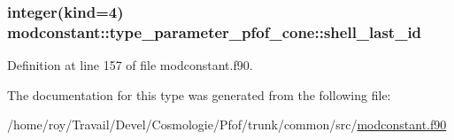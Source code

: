 \subsubsection[{\texorpdfstring{shell\+\_\+last\+\_\+id}{shell_last_id}}]{\setlength{\rightskip}{0pt plus 5cm}integer(kind=4) modconstant\+::type\+\_\+parameter\+\_\+pfof\+\_\+cone\+::shell\+\_\+last\+\_\+id}\hypertarget{structmodconstant_1_1type__parameter__pfof__cone_a50cff304d33c3b950d4e9f2cb3ffb70d}{}\label{structmodconstant_1_1type__parameter__pfof__cone_a50cff304d33c3b950d4e9f2cb3ffb70d}


Definition at line 157 of file modconstant.\+f90.



The documentation for this type was generated from the following file\+:\begin{DoxyCompactItemize}
\item 
/home/roy/\+Travail/\+Devel/\+Cosmologie/\+Pfof/trunk/common/src/\hyperlink{modconstant_8f90}{modconstant.\+f90}\end{DoxyCompactItemize}
